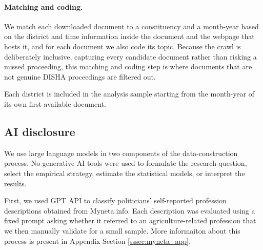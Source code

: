 \documentclass[12pt]{article}
\begin{document}
{\paragraph{Matching and coding.} We match each downloaded document to a constituency and a
month-year based on the district and time information inside the document and
the webpage that hosts it, and for each document we also code its topic. Because
the crawl is deliberately inclusive, capturing every candidate document rather
than risking a missed proceeding, this matching and coding step is where
documents that are not genuine DISHA proceedings are filtered out.

Each district is included in the analysis sample starting from the month-year of its own first available document.

 \subsection{AI disclosure}\label{ssec:ai}



We use large language models in two components of the data-construction process. No generative AI tools were used to formulate the research question, select the empirical strategy, estimate the statistical models, or interpret the results.

First, we used GPT API to classify politicians’ self-reported profession descriptions obtained from Myneta.info. Each description was evaluated using a fixed prompt asking whether it referred to an agriculture-related profession that we then manually validate for a small sample. More informaiton about this process is present in Appendix Section \ref{sssec:myneta_app}.

}
\end{document}
